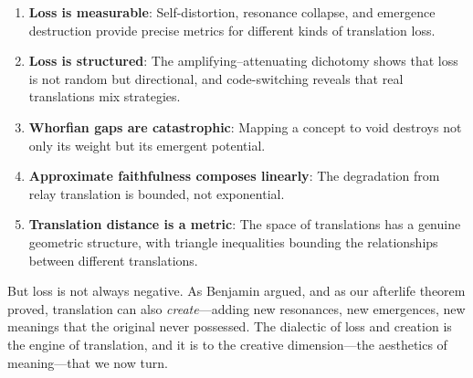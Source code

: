 \begin{enumerate}
\item \textbf{Loss is measurable}: Self-distortion, resonance collapse, and
emergence destruction provide precise metrics for different kinds of
translation loss.

\item \textbf{Loss is structured}: The amplifying--attenuating dichotomy
shows that loss is not random but directional, and code-switching reveals
that real translations mix strategies.

\item \textbf{Whorfian gaps are catastrophic}: Mapping a concept to void
destroys not only its weight but its emergent potential.

\item \textbf{Approximate faithfulness composes linearly}: The degradation
from relay translation is bounded, not exponential.

\item \textbf{Translation distance is a metric}: The space of translations
has a genuine geometric structure, with triangle inequalities bounding
the relationships between different translations.
\end{enumerate}

But loss is not always negative.  As Benjamin argued, and as our
afterlife theorem proved, translation can also \emph{create}---adding
new resonances, new emergences, new meanings that the original never
possessed.  The dialectic of loss and creation is the engine of
translation, and it is to the creative dimension---the aesthetics of
meaning---that we now turn.

